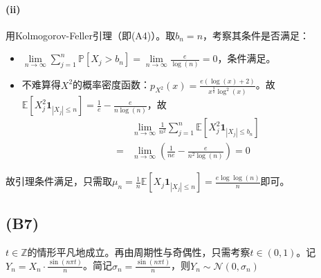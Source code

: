 \documentclass{ctexart}
\begin{document}
\paragraph{(ii)}
用Kolmogorov-Feller引理（即(A4)）。取$b_n=n$，考察其条件是否满足：
\begin{itemize}
\item $\lim\limits_{n\to \infty}\sum\limits_{j=1}^n\mathbb{P}\left[ X_j>b_n \right]=\lim\limits_{n\to \infty}\frac{e}{\log(n)}=0$，条件满足。
\item 不难算得$X^2$的概率密度函数：$p_{X^2}(x)=\frac{e(\log(x)+2)}{x^{\frac{3}{2}}\log^2(x)}$。故$\underset{}{\mathbb{E}}\left[ X_j^2 \mathbf{1}_{|X_j|\leq n}\right]=\frac{1}{e}-\frac{e}{n\log(n)}$，故
\begin{align*}
  &\lim\limits_{n\to\infty}\frac{1}{n^2}\sum\limits_{j=1}^n \underset{}{\mathbb{E}}\left[ X_j^2 \mathbf{1}_{|X_j|\leq b_n}\right]\\
  =&\lim\limits_{n\to\infty}(\frac{1}{ne}-\frac{e}{n^2\log(n)})=0
\end{align*}

\end{itemize}
故引理条件满足，只需取$\mu_n=\frac{1}{n}\underset{}{\mathbb{E}}\left[ X_j\mathbf{1}_{|X_j|\leq n}\right]=\frac{e\log\log(n)}{n} $即可。

\subsection{(B7)}
$t\in\mathbb{Z}$的情形平凡地成立。再由周期性与奇偶性，只需考察$t\in(0,1)$。记$Y_n= X_n\cdot \frac{\sin(n\pi t)}{n}$。简记$\sigma_n=\frac{\sin(n\pi t)}{n}$，则$Y_n\sim \mathcal{N}(0, \sigma_n)$
\end{document}
